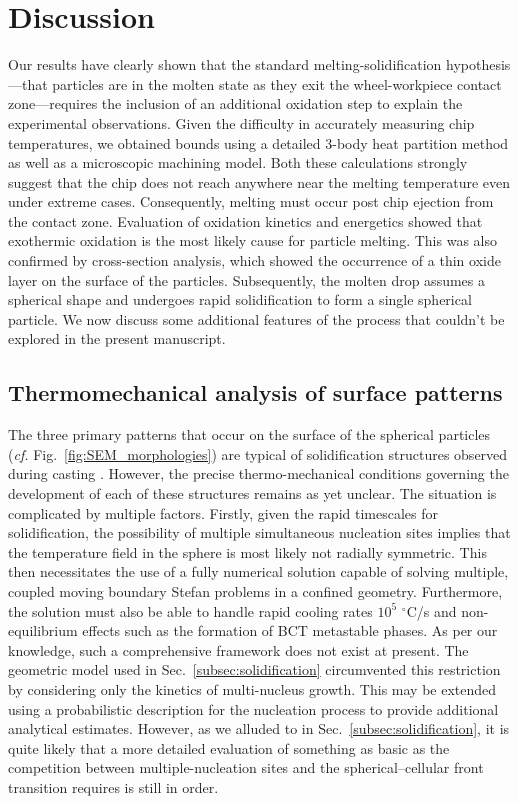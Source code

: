 \documentclass[11pt]{article}
\begin{document}
\section{Discussion}
\label{sec:discussion}

Our results have clearly shown that the standard melting-solidification hypothesis---that particles are in the molten state as they exit the wheel-workpiece contact zone---requires the inclusion of an additional oxidation step to explain the experimental observations. Given the difficulty in accurately measuring chip temperatures, we obtained bounds using a detailed 3-body heat partition method as well as a microscopic machining model. Both these calculations strongly suggest that the chip does not reach anywhere near the melting temperature even under extreme cases. Consequently, melting must occur post chip ejection from the contact zone. Evaluation of oxidation kinetics and energetics showed that exothermic oxidation is the most likely cause for particle melting. This was also confirmed by cross-section analysis, which showed the occurrence of a thin oxide layer on the surface of the particles. Subsequently, the molten drop assumes a spherical shape and undergoes rapid solidification to form a single spherical particle. We now discuss some additional features of the process that couldn't be explored in the present manuscript. 

\subsection{Thermomechanical analysis of surface patterns}  
The three primary patterns that occur on the surface of the spherical particles (\emph{cf.} Fig.~\ref{fig:SEM_morphologies}) are typical of solidification structures observed during casting \cite{flemings1974solidification}. However, the precise thermo-mechanical conditions governing the development of each of these structures remains as yet unclear. The situation is complicated by multiple factors. Firstly, given the rapid timescales for solidification, the possibility of multiple simultaneous nucleation sites implies that the temperature field in the sphere is most likely not radially symmetric. This then necessitates the use of a fully numerical solution capable of solving multiple, coupled moving boundary Stefan problems in a confined geometry. Furthermore, the solution must also be able to handle rapid cooling rates $10^5$ $^\circ$C/s and non-equilibrium effects such as the formation of BCT metastable phases. As per our knowledge, such a comprehensive framework does not exist at present. The geometric model used in Sec.~\ref{subsec:solidification} circumvented this restriction by considering only the kinetics of multi-nucleus growth. This may be extended using a probabilistic description for the nucleation process \cite{Markworth1988} to provide additional analytical estimates. However, as we alluded to in Sec.~\ref{subsec:solidification}, it is quite likely that a more detailed evaluation of something as basic as the competition between multiple-nucleation sites and the spherical--cellular front transition requires is still in order. 
\end{document}
